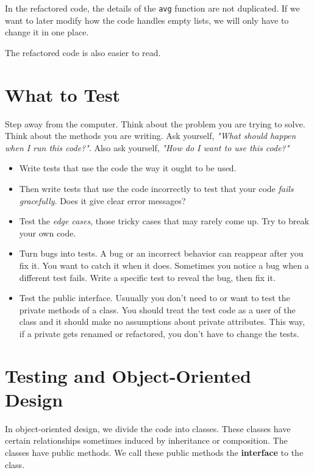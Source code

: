 In the refactored code, the details of the \texttt{avg} function are not duplicated.  If we want to later modify how the code handles empty lists, we will only have to change it in one place.  


The refactored code is also easier to read.  

\section{What to Test}


Step away from the computer.  Think about the problem you are trying to solve.  Think about the methods you are writing.  Ask yourself, \emph{"What should happen when I run this code?"}. Also ask yourself, \emph{"How do I want to use this code?"}

\begin{itemize}

\item Write tests that use the code the way it ought to be used.

\item Then write tests that use the code incorrectly to test that your code \emph{fails gracefully}.  Does it give clear error messages?

\item Test the \emph{edge cases}, those tricky cases that may rarely come up.  Try to break your own code.

\item Turn bugs into tests.  A bug or an incorrect behavior can reappear after you fix it.  You want to catch it when it does.  Sometimes you notice a bug when a different test fails.  Write a specific test to reveal the bug, then fix it.

\item Test the public interface.  Usuually you don’t need to or want to test the private methods of a class.  You should treat the test code as a user of the class and it should make no assumptions about private attributes.  This way, if a private gets renamed or refactored, you don’t have to change the tests.

\end{itemize}
\section{Testing and Object-Oriented Design}


In object-oriented design, we divide the code into classes.  These classes have certain relationships sometimes induced by inheritance or composition.  The classes have public methods.  We call these public methods the \textbf{interface} to the class.


